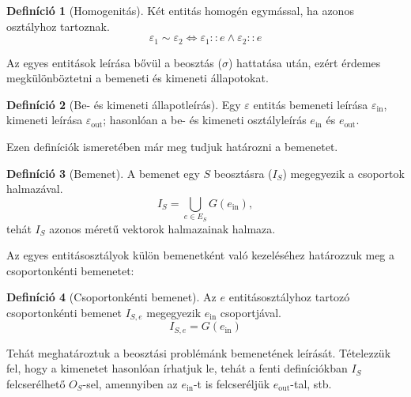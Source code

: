 \documentclass{article}
\theoremstyle{definition}
\newtheorem{definition}{Definíció}[section]
\newcommand{\subin}[1]{ {#1}_{\text{in}} }
\newcommand{\subout}[1]{ {#1}_{\text{out}} }
\begin{document}
\begin{multicols}{2}
    \begin{definition}[Homogenitás]
        Két entitás homogén egymással, ha azonos osztályhoz tartoznak.
        \begin{equation}
            \varepsilon_1 \sim \varepsilon_2 \Longleftrightarrow \varepsilon_1 :: e \wedge \varepsilon_2 :: e
        \end{equation}
    \end{definition}
    
    Az egyes entitások leírása bővül a beosztás ($\sigma$) hattatása után, ezért érdemes megkülönböztetni a bemeneti és kimeneti állapotokat.
    
    \begin{definition}[Be- és kimeneti állapotleírás]
        Egy $\varepsilon$ entitás bemeneti leírása $\subin{\varepsilon}$, kimeneti leírása $\subout{\varepsilon}$; hasonlóan a be- és kimeneti osztályleírás $\subin{e}$ és $\subout{e}$.
    \end{definition}
    
    Ezen definíciók ismeretében már meg tudjuk határozni a bemenetet.
    
    \begin{definition}[Bemenet]
        A bemenet egy $S$ beosztásra ($I_S$) megegyezik a csoportok halmazával.
        \begin{equation}
            I_S = \bigcup_{e \in E_S} G(\subin{e}),
        \end{equation}
        tehát $I_S$ azonos méretű vektorok halmazainak halmaza.
    \end{definition}
    
    Az egyes entitásosztályok külön bemenetként való kezeléséhez határozzuk meg a csoportonkénti bemenetet:
    
    \begin{definition}[Csoportonkénti bemenet]
        Az $e$ entitásosztályhoz tartozó csoportonkénti bemenet $I_{S, e}$ megegyezik $\subin{e}$ csoportjával.
        \begin{equation}
            I_{S, e} = G(\subin{e})
        \end{equation}
    \end{definition}
    
    Tehát meghatároztuk a beosztási problémánk bemenetének leírását. Tételezzük fel, hogy a kimenetet hasonlóan írhatjuk le, tehát a fenti definíciókban $I_S$ felcserélhető $O_S$-sel, amennyiben az $\subin{e}$-t is felcseréljük $\subout{e}$-tal, stb.
    

\end{multicols}
\end{document}
